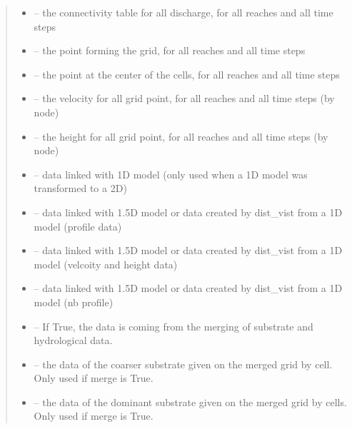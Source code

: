 \documentclass[letterpaper,10pt,english]{sphinxmanual}
\begin{document}
\begin{fulllineitems}
\begin{quote}
\begin{description}
\begin{itemize}
\item {} 
 -- the connectivity table for all discharge, for all reaches and all time steps

\item {} 
 -- the point forming the grid, for all reaches and all time steps

\item {} 
 -- the point at the center of the cells, for all reaches and all time steps

\item {} 
 -- the velocity for all grid point, for all reaches and all time steps (by node)

\item {} 
 -- the height for all grid point, for all reaches and all time steps (by node)

\item {} 
 -- data linked with 1D model (only used when a 1D model was transformed to a 2D)

\item {} 
 -- data linked with 1.5D model or data created by dist\_vist from a 1D model (profile data)

\item {} 
 -- data linked with 1.5D model or data created by dist\_vist from a 1D model (velcoity and height data)

\item {} 
 -- data linked with 1.5D model or data created by dist\_vist from a 1D model (nb profile)

\item {} 
 -- If True, the data is coming from the merging of substrate and hydrological data.

\item {} 
 -- the data of the coarser substrate given on the merged grid by cell. Only used if merge is True.

\item {} 
 -- the data of the dominant substrate given on the merged grid by cells. Only used if merge is True.


\end{itemize}
\end{description}
\end{quote}
\end{fulllineitems}
\end{document}
